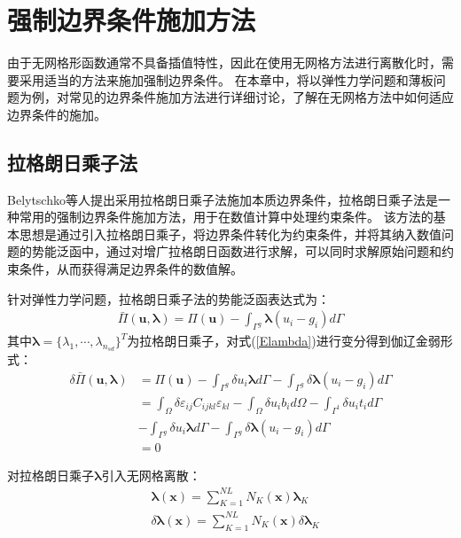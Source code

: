 \chapter{强制边界条件施加方法}
由于无网格形函数通常不具备插值特性，因此在使用无网格方法进行离散化时，需要采用适当的方法来施加强制边界条件。
在本章中，将以弹性力学问题和薄板问题为例，对常见的边界条件施加方法进行详细讨论，了解在无网格方法中如何适应边界条件的施加。

\section{拉格朗日乘子法}
Belytschko等人\cite{}提出采用拉格朗日乘子法施加本质边界条件，拉格朗日乘子法是一种常用的强制边界条件施加方法，用于在数值计算中处理约束条件。
该方法的基本思想是通过引入拉格朗日乘子，将边界条件转化为约束条件，并将其纳入数值问题的势能泛函中，通过对增广拉格朗日函数进行求解，可以同时求解原始问题和约束条件，从而获得满足边界条件的数值解。\par
针对弹性力学问题，拉格朗日乘子法的势能泛函表达式为：
\begin{equation}\label{Elambda}
\begin{split}
    \bar{\Pi}(\pmb{u},\pmb{\lambda})=\Pi(\pmb{u})-\int_{\Gamma^g}\pmb{\lambda}(u_i-g_i)d\Gamma
\end{split}
\end{equation}   
其中$\pmb{\lambda}=\{\lambda_1,\dotsb,\lambda_{n_{sd}}\}^T$为拉格朗日乘子，对式(\ref{Elambda})进行变分得到伽辽金弱形式：
\begin{equation}\label{Elambda weakform}
\begin{split}
        \delta\bar{\Pi}(\pmb{u},\pmb{\lambda})&=\Pi(\pmb{u})-\int_{\Gamma^g}\delta u_i\pmb{\lambda}d\Gamma-\int_{\Gamma^g}\delta\pmb{\lambda}(u_i-g_i)d\Gamma\\
       &=\int_{\Omega}\delta\varepsilon_{ij}C_{ijkl}\varepsilon_{kl}-\int_{\Omega}\delta u_ib_id\Omega-\int_{\Gamma^t}\delta u_it_id\Gamma\\
       &-\int_{\Gamma^g}\delta u_i\pmb{\lambda}d\Gamma-\int_{\Gamma^g}\delta\pmb{\lambda}(u_i-g_i)d\Gamma\\
       &=0
\end{split}
\end{equation}\par
对拉格朗日乘子$\pmb{\lambda}$引入无网格离散：
\begin{equation}\label{lambdalisan}
\begin{split}
    &\pmb{\lambda}(\pmb{x})=\sum_{K=1}^{N\!L}N_K(\pmb{x})\pmb \lambda_K\\
&\delta\pmb{\lambda}(\pmb{x})=\sum_{K=1}^{N\!L}N_K(\pmb{x})\delta\pmb \lambda_K
\end{split}
\end{equation}
